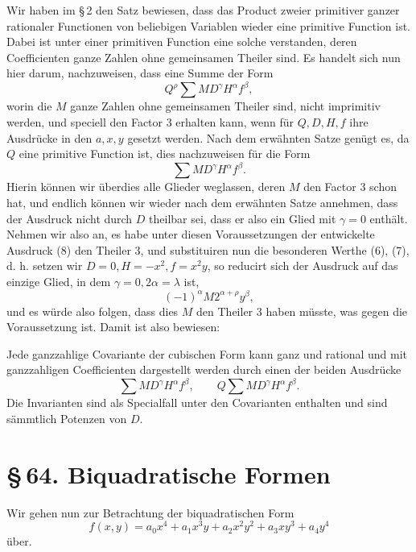 \documentclass[11pt]{article}
\newcommand{\sect}[2]{\section*{\S\,#1. #2}}
\begin{document}
Wir haben im \S\,2 den Satz bewiesen, dass das Product zweier primitiver ganzer rationaler Functionen von beliebigen Variablen wieder eine primitive Function ist. Dabei ist unter einer primitiven Function eine solche verstanden, deren Coefficienten ganze Zahlen ohne gemeinsamen Theiler sind. Es handelt sich nun hier darum, nachzuweisen, dass eine Summe der Form
\[
 Q^\rho\sum MD^\gamma H^\alpha f^\beta,
\]
worin die $M$ ganze Zahlen ohne gemeinsamen Theiler sind, nicht imprimitiv werden, und speciell den Factor $3$ erhalten kann, wenn für $Q,D,H,f$ ihre Ausdrücke in den $a,x,y$ gesetzt werden. Nach dem erwähnten Satze genügt es, da $Q$ eine primitive Function ist, dies nachzuweisen für die Form
\begin{equation}
 \sum MD^\gamma H^\alpha f^\beta.
\tag{8}
\end{equation}
Hierin können wir überdies alle Glieder weglassen, deren $M$ den Factor $3$ schon hat, und endlich können wir wieder nach dem erwähnten Satze annehmen, dass der Ausdruck nicht durch $D$ theilbar sei, dass er also ein Glied mit $\gamma=0$ enthält. Nehmen wir also an, es habe unter diesen Voraussetzungen der entwickelte Ausdruck (8) den Theiler $3$, und substituiren nun die besonderen Werthe (6), (7), d. h. setzen wir $D=0,H=-x^2,f=x^2y$, so reducirt sich der Ausdruck auf das einzige Glied, in dem $\gamma=0,2\alpha=\lambda$ ist,
\[
 (-1)^\alpha M2^{\alpha+\rho}y^\beta,
\]
und es würde also folgen, dass dies $M$ den Theiler $3$ haben müsste, was gegen die Voraussetzung ist. Damit ist also bewiesen:

Jede ganzzahlige Covariante der cubischen Form kann ganz und rational und mit ganzzahligen Coefficienten dargestellt werden durch einen der beiden Ausdrücke
\[
 \sum MD^\gamma H^\alpha f^\beta,
 \qquad
 Q\sum MD^\gamma H^\alpha f^\beta.
\]
Die Invarianten sind als Specialfall unter den Covarianten enthalten und sind sämmtlich Potenzen von $D$.

\sect{64}{Biquadratische Formen}

Wir gehen nun zur Betrachtung der biquadratischen Form
\begin{equation}
 f(x,y)=a_0x^4+a_1x^3y+a_2x^2y^2+a_3xy^3+a_4y^4
\tag{1}
\end{equation}
über.
\end{document}
